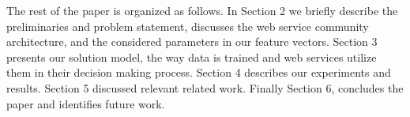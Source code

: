 \documentclass[10pt,journal,cspaper,compsoc]{IEEEtran}
\begin{document}
The rest of the paper is organized as follows. In Section 2 we briefly describe the preliminaries and problem statement, discusses the web service community architecture, and the considered parameters in our feature vectors. Section 3 presents our solution model, the way data is trained and web services utilize them in their decision making process. Section 4 describes our experiments and results. Section 5 discussed relevant related work. Finally Section 6, concludes the paper and identifies future work.







\end{document}
